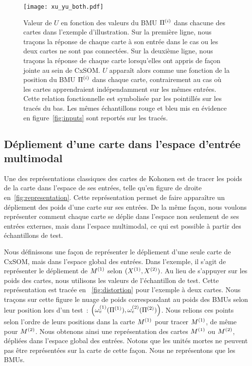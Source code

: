 \documentclass[../main]{subfiles}
\begin{document}
\begin{figure}
\centering
\texttt{[image: xu\_yu\_both.pdf]}
\caption{Valeur de $U$ en fonction des valeurs du BMU $\Pi^{({i})}$ dans chacune des cartes dans l'exemple d'illustration. Sur la première ligne, nous traçons la réponse de chaque carte à son entrée dans le cas ou les deux cartes ne sont pas connectées. Sur la deuxième ligne, nous traçons la réponse de chaque carte lorsqu'elles ont appris de façon jointe au sein de CxSOM.
$U$ apparaît alors comme une fonction de la position du BMU $\Pi^{({i})}$ dans chaque carte, contrairement au cas où les cartes apprendraient indépendamment sur les mêmes entrées. Cette relation fonctionnelle est symbolisée par les pointillés sur les tracés du bas. Les mêmes échantillons rouge et bleu mis en évidence en figure~\ref{fig:inputs} sont reportés sur les tracés.}
\label{fig:piu}
\end{figure}

\subsection{Dépliement d'une carte dans l'espace d'entrée multimodal}

Une des représentations classiques des cartes de Kohonen est de tracer les poids de la carte dans l'espace de ses entrées, telle qu'en figure de droite en~\ref{fig:representation}. Cette représentation permet de faire apparaître un dépliement des poids d'une carte sur ses entrées.
De la même façon, nous voulons représenter comment chaque carte se déplie dans l'espace non seulement de ses entrées externes, mais dans l'espace multimodal, ce qui est possible à partir des échantillons de test.

Nous définissons une façon de représenter le dépliement d'une seule carte de CxSOM, mais dans l'espace global des entrées. Dans l'exemple, il s'agit de représenter le dépliement de $M^{({1})}$ selon $(X^{({1})},X^{({2})})$.
Au lieu de s'appuyer sur les poids des cartes, nous utilisons les valeurs de l'échantillon de test. Cette représentation est tracée en ~\ref{fig:distortion} pour l'exemple à deux cartes.
Nous traçons sur cette figure le nuage de poids correspondant au poids des BMUs selon leur position lors d'un test~: $\left( \omega_e^{({1})}(\Pi^{({1})}),\omega_e^{({2})}(\Pi^{({2})}) \right)$. 
Nous relions ces points selon l'ordre de leurs positions dans la carte $M^{({1})}$ pour tracer $M^{({1})}$, de même pour $M^{({2})}$. 
Nous obtenons ainsi une représentation des cartes $M^{({1})}$ ou $M^{({2})}$, dépliées dans l'espace global des entrées. 
Notons que les unités mortes ne peuvent pas être représentées sur la carte de cette façon. Nous ne représentons que les BMUs. 
\end{document}
